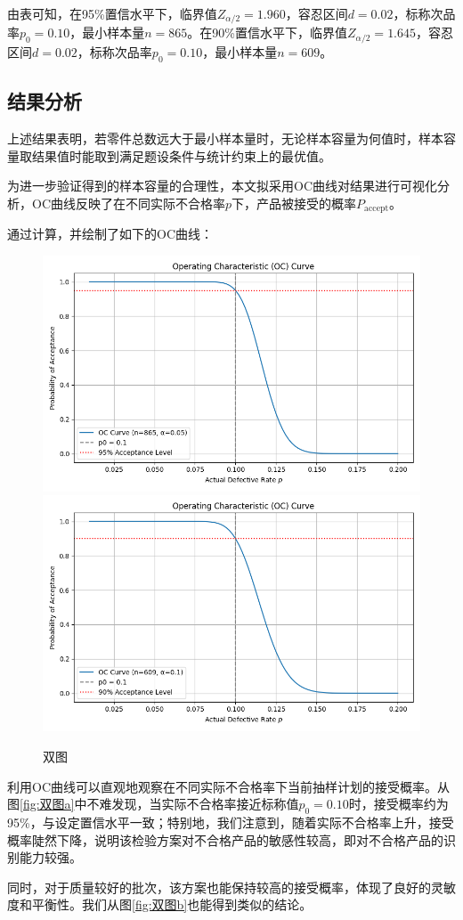 \documentclass[withoutpreface,bwprint]{cumcmthesis}
\begin{document}
由表可知，在95\%置信水平下，临界值$Z_{\alpha/2}=1.960$，容忍区间$d=0.02$，标称次品率$p_0=0.10$，最小样本量$n=865$。在90\%置信水平下，临界值$Z_{\alpha/2}=1.645$，容忍区间$d=0.02$，标称次品率$p_0=0.10$，最小样本量$n=609$。

\subsection{结果分析}
上述结果表明，若零件总数远大于最小样本量时，无论样本容量为何值时，样本容量取结果值时能取到满足题设条件与统计约束上的最优值。

为进一步验证得到的样本容量的合理性，本文拟采用OC曲线对结果进行可视化分析，OC曲线反映了在不同实际不合格率$p$下，产品被接受的概率$P_{\text{accept}}$。

通过计算，并绘制了如下的OC曲线：

\begin{figure}[h!]
\centering
{}
{\includegraphics[width=.49\textwidth]{figure/OC_curve_1.png}}
{\includegraphics[width=.49\textwidth]{figure/OC_curve_2.png}}
\caption{双图}\label{fig:双图}
\end{figure} 

利用OC曲线可以直观地观察在不同实际不合格率下当前抽样计划的接受概率。从图\ref{fig:双图a}中不难发现，当实际不合格率接近标称值$p_0=0.10$时，接受概率约为95\%，与设定置信水平一致；特别地，我们注意到，随着实际不合格率上升，接受概率陡然下降，说明该检验方案对不合格产品的敏感性较高，即对不合格产品的识别能力较强。

同时，对于质量较好的批次，该方案也能保持较高的接受概率，体现了良好的灵敏度和平衡性。我们从图\ref{fig:双图b}也能得到类似的结论。
\end{document}
